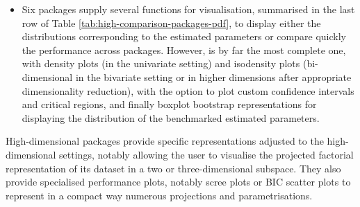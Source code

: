 \begin{itemize}
\tightlist
\item
  Six packages supply several functions for visualisation, summarised in the last row of Table \ref{tab:high-comparison-packages-pdf}, to display either the distributions corresponding to the estimated parameters or compare quickly the performance across packages. However,  is by far the most complete one, with density plots (in the univariate setting) and isodensity plots (bi-dimensional in the bivariate setting or in higher dimensions after appropriate dimensionality reduction), with the option to plot custom confidence intervals and critical regions, and finally boxplot bootstrap representations for displaying the distribution of the benchmarked estimated parameters.
\end{itemize}

High-dimensional packages provide specific representations adjusted to the high-dimensional settings, notably allowing the user to visualise the projected factorial representation of its dataset in a two or three-dimensional subspace. They also provide specialised performance plots, notably scree plots or BIC scatter plots to represent in a compact way numerous projections and parametrisations.

